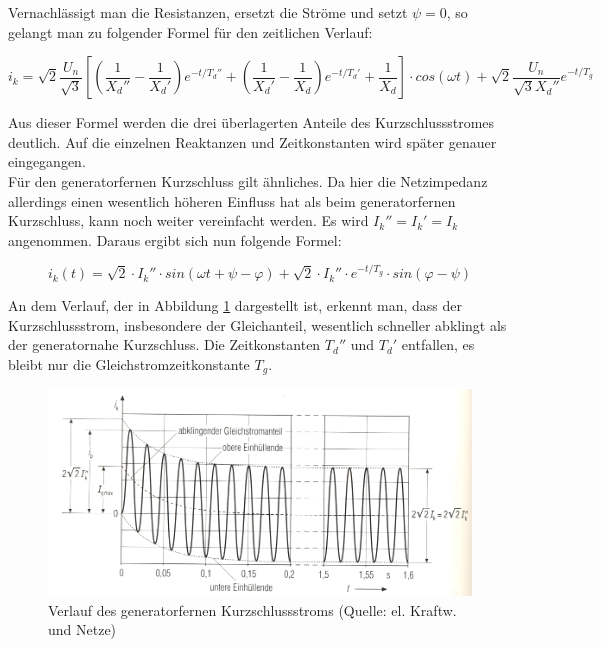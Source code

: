 \documentclass{scrartcl}
\begin{document}
\begin{onehalfspace}
Vernachlässigt man die Resistanzen, ersetzt die Ströme und setzt $\psi = 0$, so gelangt man zu folgender Formel für den zeitlichen Verlauf:

\begin{equation}
i_k = \sqrt{2} \frac{U_n}{\sqrt{3}} [(\frac{1}{X_d''} - \frac{1}{X_d'}) e^{-t/T_d''} + (\frac{1}{X_d'} - \frac{1}{X_d}) e^{-t/T_d'} + \frac{1}{X_d}] \cdot cos(\omega t) + \sqrt{2} \frac{U_n}{\sqrt{3} X_d''} e^{-t/T_g}
\end{equation}

Aus dieser Formel werden die drei überlagerten Anteile des Kurzschlussstromes deutlich. Auf die einzelnen Reaktanzen und Zeitkonstanten wird später genauer eingegangen. \\

Für den generatorfernen Kurzschluss gilt ähnliches. Da hier die Netzimpedanz allerdings einen wesentlich höheren Einfluss hat als beim generatorfernen Kurzschluss, kann noch weiter vereinfacht werden. Es wird $I_k'' = I_k' = I_k$ angenommen. Daraus ergibt sich nun folgende Formel:

\begin{equation}
i_k(t) = \sqrt{2} \cdot I_k'' \cdot sin(\omega t + \psi - \varphi) + \sqrt{2} \cdot I_k'' \cdot e^{-t/T_g} \cdot sin(\varphi - \psi)
\end{equation}

An dem Verlauf, der in Abbildung \ref{kss-verlauf-fern} dargestellt ist, erkennt man, dass der Kurzschlussstrom, insbesondere der Gleichanteil, wesentlich schneller abklingt als der generatornahe Kurzschluss. Die Zeitkonstanten $T_d''$ und $T_d'$ entfallen, es bleibt nur die Gleichstromzeitkonstante $T_g$.

	\begin{figure}[H]
	\centering
	\includegraphics[scale=1]{img/kurzschlussstromverlauf-fern.jpg}
	\caption{Verlauf des generatorfernen Kurzschlussstroms (Quelle: el. Kraftw. und Netze)}
	\label{kss-verlauf-fern}
	\end{figure}
	

\end{onehalfspace}
\end{document}
